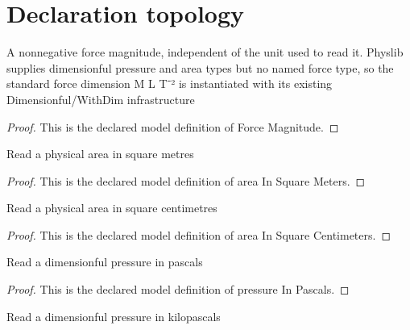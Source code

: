 \section{Declaration topology}
\begin{definition}
  \label{def:physics:phyx-mini-0383:phyxminiproblems-problemphyxmini0383-forcemagnitude}
  A nonnegative force magnitude, independent of the unit used to read it. Physlib supplies dimensionful pressure and area types but no named force type, so the standard force dimension M L T⁻² is instantiated with its existing Dimensionful/WithDim infrastructure
\end{definition}
\begin{proof}
  This is the declared model definition of Force Magnitude.
\end{proof}
\begin{definition}
  \label{def:physics:phyx-mini-0383:phyxminiproblems-problemphyxmini0383-areainsquaremeters}
  Read a physical area in square metres
\end{definition}
\begin{proof}
  This is the declared model definition of area In Square Meters.
\end{proof}
\begin{definition}
  \label{def:physics:phyx-mini-0383:phyxminiproblems-problemphyxmini0383-areainsquarecentimeters}
  Read a physical area in square centimetres
\end{definition}
\begin{proof}
  This is the declared model definition of area In Square Centimeters.
\end{proof}
\begin{definition}
  \label{def:physics:phyx-mini-0383:phyxminiproblems-problemphyxmini0383-pressureinpascals}
  Read a dimensionful pressure in pascals
\end{definition}
\begin{proof}
  This is the declared model definition of pressure In Pascals.
\end{proof}
\begin{definition}
  \label{def:physics:phyx-mini-0383:phyxminiproblems-problemphyxmini0383-pressureinkilopascals}
  Read a dimensionful pressure in kilopascals
\end{definition}
